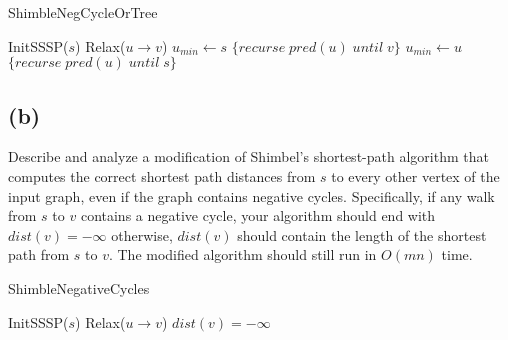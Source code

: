 \documentclass[12pt]{article}
\begin{document}
\begin{algorithm}
\caption{ShimbleNegCycleOrTree}
\begin{algorithmic}
    \STATE InitSSSP($s$)
                \STATE Relax($u \rightarrow v$)
            \ENDIF
        \ENDFOR
    \ENDFOR
    \STATE $u_{min} \leftarrow s$
            \RETURN $\{ recurse\; pred(u)\; until\; v \}$
        \ENDIF
            \STATE $u_{min} \leftarrow u$
        \ENDIF
        \RETURN $\{ recurse\; pred(u)\; until\; s \}$
    \ENDFOR
\end{algorithmic}
\end{algorithm}

\pagebreak

\subsection*{(b)}
Describe and analyze a modification of Shimbel's shortest-path
algorithm that computes the correct shortest path distances from $s$ to
every other vertex of the input graph, even if the graph contains
negative cycles. Specifically, if any walk from $s$ to $v$ contains a
negative cycle, your algorithm should end with $dist(v) = -\infty$
otherwise, $dist(v)$ should contain the length of the shortest path
from $s$ to $v$. The modified algorithm should still run in $O(mn)$
time.

\begin{algorithm}
\caption{ShimbleNegativeCycles}
\begin{algorithmic}
    \STATE InitSSSP($s$)
                \STATE Relax($u \rightarrow v$)
            \ENDIF
        \ENDFOR
    \ENDFOR
            \STATE $dist(v) = -\infty$
        \ENDIF
    \ENDFOR
\end{algorithmic}
\end{algorithm}
\end{document}
